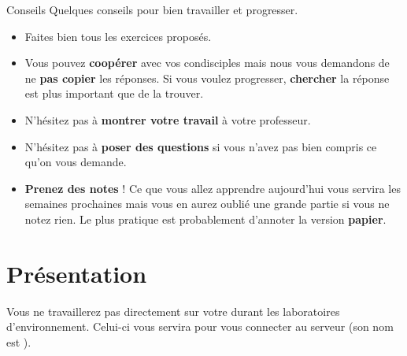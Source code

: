 \documentclass[a4paper,11pt]{style-esi/td}
\begin{document}
\entete
\titre
{}
\lastedit

\bigskip
\tableofcontents

\vfill
\begin{coltbox}{Conseils}
	Quelques conseils pour bien travailler et progresser.
	\begin{itemize}
	\item 
		Faites bien tous les exercices proposés.
	\item 
		Vous pouvez \textbf{coopérer} avec vos condisciples 
		mais nous vous demandons de ne \textbf{pas copier} les réponses. 
		Si vous voulez progresser, \textbf{chercher} la réponse est plus important que de la trouver. 
	\item 
		N'hésitez pas à \textbf{montrer votre travail} à votre professeur.
	\item 
		N'hésitez pas à \textbf{poser des questions} 
		si vous n'avez pas bien compris ce qu'on vous demande.
	\item 
		\textbf{Prenez des notes} ! 
		Ce que vous allez apprendre aujourd'hui 
		vous servira les semaines prochaines 
		mais vous en aurez oublié une grande partie si vous ne notez rien. 
		Le plus pratique est probablement d'annoter la version \textbf{papier}. 
	\end{itemize}
\end{coltbox}
\vfill
	
\newpage


	\section{Présentation}

		Vous ne travaillerez pas directement sur votre  durant les laboratoires d'environnement. 
		Celui-ci vous servira pour vous connecter au serveur 
		(son nom est ).
\end{document}

